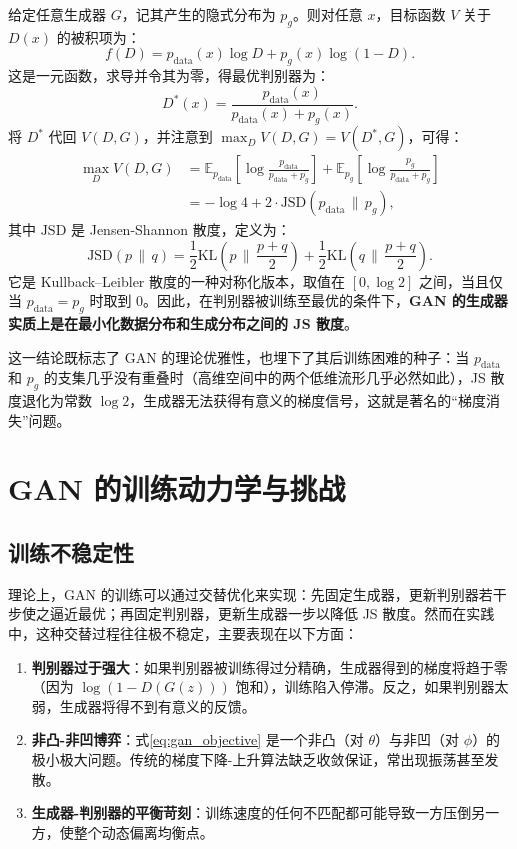 给定任意生成器 $G$，记其产生的隐式分布为 $p_g$。则对任意 $x$，目标函数 $V$ 关于 $D(x)$ 的被积项为：
\[
f(D) = p_{\text{data}}(x) \log D + p_g(x) \log(1 - D).
\]
这是一元函数，求导并令其为零，得最优判别器为：
\begin{equation}\label{eq:optimal_D}
D^*(x) = \frac{p_{\text{data}}(x)}{p_{\text{data}}(x) + p_g(x)}.
\end{equation}
将 $D^*$ 代回 $V(D, G)$，并注意到 $\max_D V(D, G) = V(D^*, G)$，可得：
\begin{align}
\max_D V(D, G) &= \mathbb{E}_{p_{\text{data}}}\!\left[\log \frac{p_{\text{data}}}{p_{\text{data}}+p_g}\right] + \mathbb{E}_{p_g}\!\left[\log \frac{p_g}{p_{\text{data}}+p_g}\right] \nonumber \\
&= -\log 4 + 2\cdot \text{JSD}(p_{\text{data}} \,\|\, p_g),
\end{align}
其中 $\text{JSD}$ 是 Jensen-Shannon 散度，定义为：
\[
\text{JSD}(p \,\|\, q) = \frac12 \text{KL}\!\left(p \,\Big\|\, \frac{p+q}{2}\right) + \frac12 \text{KL}\!\left(q \,\Big\|\, \frac{p+q}{2}\right).
\]
它是 Kullback–Leibler 散度的一种对称化版本，取值在 $[0, \log 2]$ 之间，当且仅当 $p_{\text{data}} = p_g$ 时取到 $0$。因此，在判别器被训练至最优的条件下，\textbf{GAN 的生成器实质上是在最小化数据分布和生成分布之间的 JS 散度}\cite{goodfellow2014generativeadversarialnetworks}。

这一结论既标志了 GAN 的理论优雅性，也埋下了其后训练困难的种子：当 $p_{\text{data}}$ 和 $p_g$ 的支集几乎没有重叠时（高维空间中的两个低维流形几乎必然如此），JS 散度退化为常数 $\log 2$，生成器无法获得有意义的梯度信号，这就是著名的“梯度消失”问题。

\section{GAN 的训练动力学与挑战}

\subsection{训练不稳定性}

理论上，GAN 的训练可以通过交替优化来实现：先固定生成器，更新判别器若干步使之逼近最优；再固定判别器，更新生成器一步以降低 JS 散度。然而在实践中，这种交替过程往往极不稳定，主要表现在以下方面：

\begin{enumerate}
\item \textbf{判别器过于强大}：如果判别器被训练得过分精确，生成器得到的梯度将趋于零（因为 $\log(1-D(G(z)))$ 饱和），训练陷入停滞。反之，如果判别器太弱，生成器将得不到有意义的反馈。
\item \textbf{非凸-非凹博弈}：式\eqref{eq:gan_objective} 是一个非凸（对 $\theta$）与非凹（对 $\phi$）的极小极大问题。传统的梯度下降-上升算法缺乏收敛保证，常出现振荡甚至发散。
\item \textbf{生成器-判别器的平衡苛刻}：训练速度的任何不匹配都可能导致一方压倒另一方，使整个动态偏离均衡点。
\end{enumerate}

